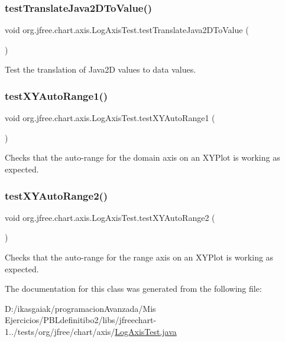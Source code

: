 \subsubsection{\texorpdfstring{test\+Translate\+Java2\+D\+To\+Value()}{testTranslateJava2DToValue()}}
{\footnotesize\ttfamily void org.\+jfree.\+chart.\+axis.\+Log\+Axis\+Test.\+test\+Translate\+Java2\+D\+To\+Value (\begin{DoxyParamCaption}{ }\end{DoxyParamCaption})}

Test the translation of Java2D values to data values. \mbox{\label{classorg_1_1jfree_1_1chart_1_1axis_1_1_log_axis_test_a202a57d7d2e0af4b1257080a664b1628}} 
\subsubsection{\texorpdfstring{test\+X\+Y\+Auto\+Range1()}{testXYAutoRange1()}}
{\footnotesize\ttfamily void org.\+jfree.\+chart.\+axis.\+Log\+Axis\+Test.\+test\+X\+Y\+Auto\+Range1 (\begin{DoxyParamCaption}{ }\end{DoxyParamCaption})}

Checks that the auto-\/range for the domain axis on an X\+Y\+Plot is working as expected. \mbox{\label{classorg_1_1jfree_1_1chart_1_1axis_1_1_log_axis_test_a30d9c708bb32096d51c1e22b17f21316}} 
\subsubsection{\texorpdfstring{test\+X\+Y\+Auto\+Range2()}{testXYAutoRange2()}}
{\footnotesize\ttfamily void org.\+jfree.\+chart.\+axis.\+Log\+Axis\+Test.\+test\+X\+Y\+Auto\+Range2 (\begin{DoxyParamCaption}{ }\end{DoxyParamCaption})}

Checks that the auto-\/range for the range axis on an X\+Y\+Plot is working as expected. 

The documentation for this class was generated from the following file\+:\begin{DoxyCompactItemize}
\item 
D\+:/ikasgaiak/programacion\+Avanzada/\+Mis Ejercicios/\+P\+B\+Ldefinitibo2/libs/jfreechart-\/1../tests/org/jfree/chart/axis/\mbox{\hyperlink{_log_axis_test_8java}{Log\+Axis\+Test.\+java}}\end{DoxyCompactItemize}
